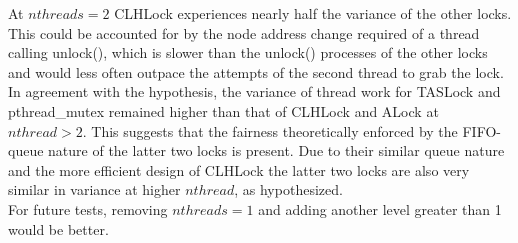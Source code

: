 \documentclass{article}
\begin{document}
\begin{adjustwidth}{-2cm}{-2cm}
At $nthreads=2$ CLHLock experiences nearly half the variance of the other locks. This could be accounted for by the node address change required of a thread calling unlock(), which is slower than the unlock() processes of the other locks and would less often outpace the attempts of the second thread to grab the lock.\\
In agreement with the hypothesis, the variance of thread work for TASLock and pthread\_mutex remained higher than that of CLHLock and ALock at $nthread > 2$. This suggests that the fairness theoretically enforced by the FIFO-queue nature of the latter two locks is present. Due to their similar queue nature and the more efficient design of CLHLock the latter two locks are also very similar in variance at higher $nthread$, as hypothesized.\\
For future tests, removing $nthreads=1$ and adding another level greater than 1 would be better. 
\end{adjustwidth}
\end{document}
